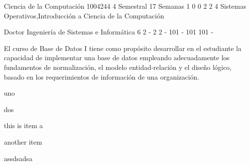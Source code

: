 \documentclass[a4paper,8pt]{article}
\begin{document}

\sylabusHeader

\academicaTable
{Ciencia de la Computación} %
{1004244} %
{4} %
{Semestral} %
{17 Semanas} %
{1} %
{0} %
{0} %
{2}  %
{2} %
{4} %
{Sistemas Operativos,Introducción a Ciencia de la Computación} %

\administrativaTable
{Doctor} %
{Ingeniería de Sistemas e Informática} %
{6} %
{2} %
{-} %
{2} %
{2} %
{-} %
{101} %
{-} %
{101} %
{101} %
{-} %


\begin{fundamentacion}
El curso de Base de Datos I tiene como propósito desarrollar en el estudiante la capacidad de implementar una base de datos empleando adecuadamente los fundamentos de normalización, el modelo entidad-relación y el diseño lógico, basado en los requerimientos de información de una organización.
\end{fundamentacion}

\begin{sumilla}
\item uno
\item dos
\end{sumilla}

\begin{competenciasAsignatura}
\item this is item a
\item another item
\item assdsadsa
\end{competenciasAsignatura}

\begin{contenidos}



\end{contenidos}
\end{document}
